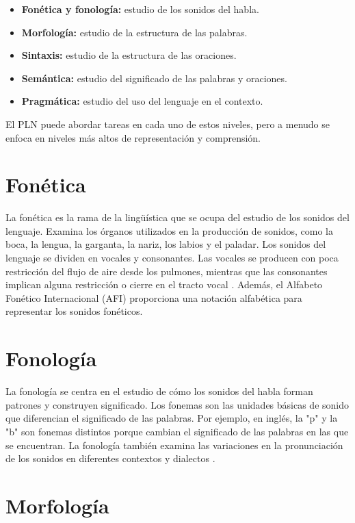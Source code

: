 \documentclass{book}
\begin{document}
\begin{itemize}
  \item \textbf{Fonética y fonología:} estudio de los sonidos del habla.
  \item \textbf{Morfología:} estudio de la estructura de las palabras.
  \item \textbf{Sintaxis:} estudio de la estructura de las oraciones.
  \item \textbf{Semántica:} estudio del significado de las palabras y oraciones.
  \item \textbf{Pragmática:} estudio del uso del lenguaje en el contexto.
\end{itemize}

El PLN puede abordar tareas en cada uno de estos niveles, pero a menudo se enfoca en niveles más altos de representación y comprensión.




\section{Fonética}

La fonética es la rama de la lingüística que se ocupa del estudio de los sonidos del lenguaje. Examina los órganos utilizados en la producción de sonidos, como la boca, la lengua, la garganta, la nariz, los labios y el paladar. Los sonidos del lenguaje se dividen en vocales y consonantes. Las vocales se producen con poca restricción del flujo de aire desde los pulmones, mientras que las consonantes implican alguna restricción o cierre en el tracto vocal \cite{JohnsonMLSS, fromkin2018introduction}. Además, el Alfabeto Fonético Internacional (AFI) proporciona una notación alfabética para representar los sonidos fonéticos.

\section{Fonología}

La fonología se centra en el estudio de cómo los sonidos del habla forman patrones y construyen significado. Los fonemas son las unidades básicas de sonido que diferencian el significado de las palabras. Por ejemplo, en inglés, la "p" y la "b" son fonemas distintos porque cambian el significado de las palabras en las que se encuentran. La fonología también examina las variaciones en la pronunciación de los sonidos en diferentes contextos y dialectos \cite{fromkin2018introduction}.

\section{Morfología}
\end{document}
